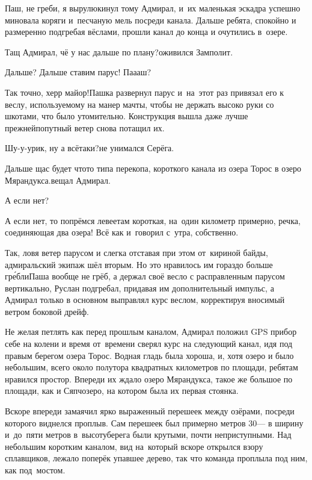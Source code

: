 \diagdash Паш, не греби, я вырулю\mdash кинул тому Адмирал, и~их маленькая эскадра успешно миновала коряги и~песчаную мель посреди канала. Дальше ребята, спокойно и размеренно подгребая вёслами, прошли канал до конца и очутились в~озере.%

\diagdash Тащ Адмирал, чё у нас дальше по плану?\mdash оживился Замполит.

\diagdash Дальше? Дальше ставим парус! Па\sdash а\sdash аш?

\diagdash Так точно, херр майор!\mdash Пашка развернул парус и~на~этот раз привязал его к веслу, используемому на манер мачты, чтобы не держать высоко руки со шкотами, что было утомительно. Конструкция вышла даже лучше прежней\mdash попутный ветер снова потащил их. 

\diagdash Шу-у-урик, ну а всё\sdash таки?\mdash не унимался Серёга.

\diagdash Дальше щас будет что\sdash то типа перекопа, короткого канала из озера Торос в озеро Мярандукса.\mdash вещал Адмирал.

\diagdash А если нет?

\diagdash А если нет, то попрёмся левее\mdash там короткая, на~один километр примерно, речка, соединяющая два озера! Всё как и~говорил с~утра, собственно.

Так, ловя ветер парусом и слегка отставая при этом от~кириной байды, адмиральский экипаж шёл вторым. Но это нравилось им гораздо больше гр{\'е}бли\mdash Паша вообще не грёб, а держал своё весло с расправленным парусом вертикально, Руслан подгребал, придавая им дополнительный импульс, а Адмирал только в основном выправлял курс веслом, корректируя вносимый ветром боковой дрейф.

Не желая петлять как перед прошлым каналом, Адмирал положил GPS прибор себе на колени и время от~времени сверял курс на следующий канал, идя под правым берегом озера Торос. Водная гладь была хороша, и, хотя озеро и было небольшим, всего около полутора квадратных километров по площади, ребятам нравился простор. Впереди их ждало озеро Мярандукса, такое же большое по площади, как и Сяпчозеро, на котором была их первая стоянка. 

Вскоре впереди замаячил ярко выраженный перешеек между озёрами, посреди которого виднелся проплыв. Сам перешеек был примерно метров 30\thinspace\nobreakdash--- в ширину и~до~пяти метров в~высоту\mdash берега были крутыми, почти неприступными. Над небольшим коротким каналом, вид на~который вскоре открылся взору сплавщиков, лежало поперёк упавшее дерево, так что команда проплыла под ним, как под~мостом.

